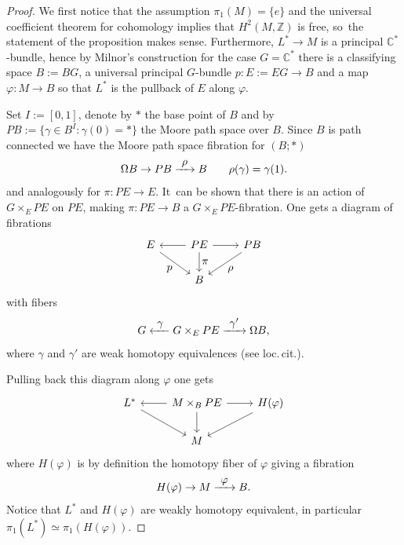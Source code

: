 \documentclass[11pt]{article}
\let\ts\textstyle
\newcommand{\To}[1]{\mathchoice{\xrightarrow{\textstyle\kern4pt#1\kern3pt}}{\xrightarrow{\,#1\,}}{}{}}
\newcommand{\From}[1]{\mathchoice{\xleftarrow{\textstyle~#1~}}{\xleftarrow{\,#1\,}}{}{}}
\let\ra\rightarrow
\begin{document}
\begin{proof}
We first notice that the assumption $\pi_1(M) = \{e\}$ and the universal coefficient theorem for cohomology implies that $H^2(M,\mathbb{Z})$ is free, so~the statement of the proposition makes sense. Furthermore, $L^* \to M$ is a principal $\mathbb{C}^*$-bundle, hence by Milnor's construction \cite{Milnor} for the case $G= \mathbb{C}^*$ there is a classifying space $B:= BG$, a universal principal $G$-bundle $p: E:= EG \ra B$ and a map $\varphi: M \ra B$ so that $L^*$ is the pullback of $E$ along $\varphi$.

Set $I :=[0,1]$, denote by $\ast$ the base point of $B$ and by $PB := \{ \gamma \in B^I : \gamma(0) = \ast\}$ the Moore path space over $B$. Since $B$ is path connected
we have the Moore path space fibration for $(B;*)$
\[
\Omega B \to PB \To{\rho} B \qquad \rho(\gamma) = \gamma(1).
\]
and analogously for $\pi: PE \ra E$. It~can be shown \cite[Prop.\,2.10]{FHT} that there is an action of $G \times_E PE$ on $PE$, making $ \pi:PE \to B$ a $G \times_E PE$-fibration. One gets a diagram of fibrations
\[
\begin{tikzcd}
E \arrow[dr, "\ts p"']
& PE \arrow[d, "\ts \pi"] \arrow[r] \arrow[l]
& PB \arrow[dl, "\ts \rho"] \\ 
& B &
\end{tikzcd}
\]
with fibers
\[
G\From{\gamma} G \times_E PE\To{\gamma'}\Omega B,
\]
where $\gamma$ and $\gamma'$ are weak homotopy equivalences (see loc.\,cit.).

Pulling back this diagram along $\varphi$ one gets
\[
\begin{tikzcd}
L^* \arrow[dr] & M \times_B PE \arrow[l] \arrow[r] \arrow[d] & H(\varphi) \arrow[dl] \\
& M &
\end{tikzcd}
\]
where $H(\varphi)$ is by definition the homotopy fiber of $\varphi$ giving a fibration
\[
H(\varphi) \to M \To{\varphi} B.
\]
Notice that $L^*$ and $H(\varphi)$ are weakly homotopy equivalent, in particular $\pi_1(L^*) \simeq \pi_1(H(\varphi))$.


\end{proof}
\end{document}
